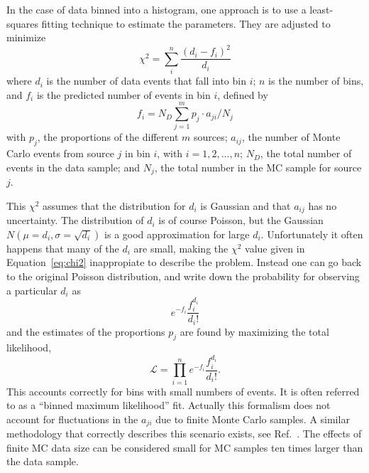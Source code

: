 In the case of data binned into a histogram, one approach is to use a least-squares fitting technique to estimate the parameters. They are adjusted to minimize
%
\begin{equation}
\chi^2 = \sum^n_i \frac{(d_i - f_i)^2}{d_i}
 \label{eq:chi2}
\end{equation}
%
where $d_i$ is the number of data events that fall into bin $i$; $n$ is the number of bins, and $f_i$ is the predicted number of events in bin $i$, defined by
%
\begin{equation}
f_i = N_D\sum^m_{j=1} p_j \cdot a_{ji}/N_j
\end{equation}
%
with $p_j$, the proportions of the different $m$ sources; $a_{ij}$, the number of Monte Carlo events from source $j$ in bin $i$, with $i=1,2,...,n$; $N_D$, the total number of events in the data sample; and $N_j$, the total number in the MC sample for source $j$.

This $\chi^2$ assumes that the distribution for $d_i$ is Gaussian and that $a_{ij}$ has no uncertainty. The distribution of $d_i$ is of course Poisson, but the Gaussian $N(\mu = d_i,\sigma = \sqrt{d_i})$ is a good approximation for large  $d_i$.  Unfortunately it often happens that many of the $d_i$ are small, making the $\chi^2$ value given in Equation~\ref{eq:chi2} inappropiate to describe the problem.  Instead one can go back to the original Poisson distribution, and write down the probability for observing a particular $d_i$ as
%
\begin{equation}
e^{-f_i} \frac{f_i^{d_i}}{d_i!} 
\end{equation}
%
and the estimates of the proportions $p_j$ are found by maximizing the total likelihood, 
%
\begin{equation}
\mathcal{L} = \prod^n_{i=1} e^{-f_i} \frac{f_i^{d_i}}{d_i!}.
\end{equation}
%
This accounts correctly for bins with small numbers of events.  It is often referred to as a ``binned maximum likelihood'' fit. Actually this formalism does not account for fluctuations in the $a_{ji}$ due to finite Monte Carlo samples. A similar methodology that correctly describes this scenario exists, see Ref.~\cite{Barlow1993219}. The effects of finite MC data size can be considered small for MC samples ten times larger than the data sample. 


